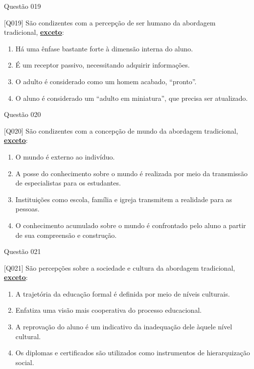 \documentclass[xcolor=dvipsnames,table]{beamer}
\begin{document}
\begin{frame}{Questão 019}
		\begin{block}{[Q019]}
		 São condizentes com a percepção de ser humano da abordagem tradicional, \underline{\bf exceto}:
		\end{block}
		\begin{enumerate}[label=(\Alph*)]
			\item Há uma ênfase bastante forte à dimensão interna do aluno.
			\item É um receptor passivo, necessitando adquirir informações.
			\item O adulto é considerado como um homem acabado, ``pronto''.
			\item O aluno é considerado um ``adulto em miniatura'', que precisa ser atualizado. 
		\end{enumerate}
	\end{frame}

\begin{frame}{Questão 020}
		\begin{block}{[Q020]}
		 São condizentes com a concepção de mundo da abordagem tradicional, \underline{\bf exceto}:
		\end{block}
		\begin{enumerate}[label=(\Alph*)]
			\item O mundo é externo ao indivíduo.
			\item A posse do conhecimento sobre o mundo é realizada por meio da transmissão de especialistas para os estudantes.
			\item Instituições como escola, família e igreja transmitem a realidade para as pessoas.
			\item O conhecimento acumulado sobre o mundo é confrontado pelo aluno a partir de sua compreensão e construção.
		\end{enumerate}
	\end{frame}

\begin{frame}{Questão 021}
		\begin{block}{[Q021]}
		 São percepções sobre a sociedade e cultura da abordagem tradicional, \underline{\bf exceto}:
		\end{block}
		\begin{enumerate}[label=(\Alph*)]
			\item A trajetória da educação formal é definida por meio de níveis culturais.
			\item Enfatiza uma visão mais cooperativa do processo educacional.
			\item A reprovação do aluno é um indicativo da inadequação dele àquele nível cultural.
			\item Os diplomas e certificados são utilizados como instrumentos de hierarquização social.
		\end{enumerate}
	\end{frame}
\end{document}
